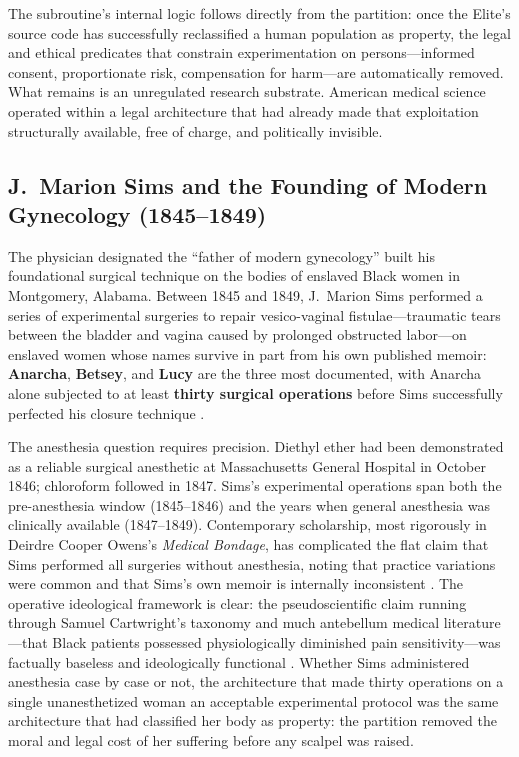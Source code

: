 The subroutine's internal logic follows directly from the partition: once the Elite's source code has successfully reclassified a human population as property, the legal and ethical predicates that constrain experimentation on persons---informed consent, proportionate risk, compensation for harm---are automatically removed. What remains is an unregulated research substrate. American medical science operated within a legal architecture that had already made that exploitation structurally available, free of charge, and politically invisible.

\subsection{J.\ Marion Sims and the Founding of Modern Gynecology (1845--1849)}
\label{subsec:sims}

The physician designated the ``father of modern gynecology'' built his foundational surgical technique on the bodies of enslaved Black women in Montgomery, Alabama. Between 1845 and 1849, J.\ Marion Sims performed a series of experimental surgeries to repair vesico-vaginal fistulae---traumatic tears between the bladder and vagina caused by prolonged obstructed labor---on enslaved women whose names survive in part from his own published memoir: \textbf{Anarcha}, \textbf{Betsey}, and \textbf{Lucy} are the three most documented, with Anarcha alone subjected to at least \textbf{thirty surgical operations} before Sims successfully perfected his closure technique \cite{sims_story, washington_medical_apartheid, owens_medical_bondage}.

The anesthesia question requires precision. Diethyl ether had been demonstrated as a reliable surgical anesthetic at Massachusetts General Hospital in October 1846; chloroform followed in 1847. Sims's experimental operations span both the pre-anesthesia window (1845--1846) and the years when general anesthesia was clinically available (1847--1849). Contemporary scholarship, most rigorously in Deirdre Cooper Owens's \textit{Medical Bondage}, has complicated the flat claim that Sims performed all surgeries without anesthesia, noting that practice variations were common and that Sims's own memoir is internally inconsistent \cite{owens_medical_bondage}. The operative ideological framework is clear: the pseudoscientific claim running through Samuel Cartwright's taxonomy and much antebellum medical literature---that Black patients possessed physiologically diminished pain sensitivity---was factually baseless and ideologically functional \cite{washington_medical_apartheid, hoffman_pain_disparity}. Whether Sims administered anesthesia case by case or not, the architecture that made thirty operations on a single unanesthetized woman an acceptable experimental protocol was the same architecture that had classified her body as property: the partition removed the moral and legal cost of her suffering before any scalpel was raised.

